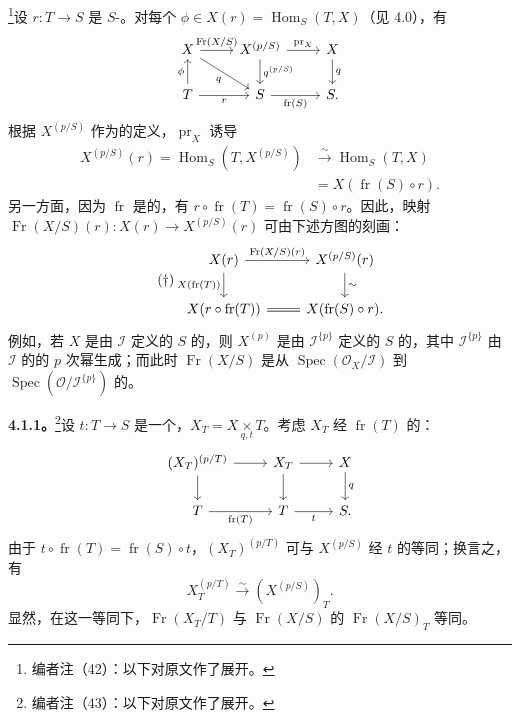 \footnote{编者注（42）：以下对原文作了展开。}设 $r:T\to S$ 是 $S$-。对每个 $\phi\in X(r)=\operatorname{Hom}_S(T,X)$（见 4.0），有
\[
\begin{tikzcd}
X\arrow[r,"\operatorname{Fr}(X/S)"]\arrow[dr,"q"']&X^{(p/S)}\arrow[r,"\operatorname{pr}_X"]\arrow[d,"q^{(p/S)}"]&X\arrow[d,"q"]\\
T\arrow[u,"\phi"]\arrow[r,"r"']&S\arrow[r,"\operatorname{fr}(S)"']&S.
\end{tikzcd}
\]
根据 $X^{(p/S)}$ 作为的定义，$\operatorname{pr}_X$ 诱导
\[
\begin{aligned}
X^{(p/S)}(r)=\operatorname{Hom}_S(T,X^{(p/S)})&\xrightarrow{\sim}\operatorname{Hom}_S(T,X)\\
&=X(\operatorname{fr}(S)\circ r).
\end{aligned}
\]
另一方面，因为 $\operatorname{fr}$ 是的，有 $r\circ\operatorname{fr}(T)=\operatorname{fr}(S)\circ r$。因此，映射 $\operatorname{Fr}(X/S)(r):X(r)\to X^{(p/S)}(r)$ 可由下述方图的刻画：
\[
\tag{$\dagger$}
\begin{tikzcd}
X(r)\arrow[r,"\operatorname{Fr}(X/S)(r)"]\arrow[d,"X(\operatorname{fr}(T))"']&X^{(p/S)}(r)\arrow[d,"\sim"]\\
X(r\circ\operatorname{fr}(T))\arrow[r,equal]&X(\operatorname{fr}(S)\circ r).
\end{tikzcd}
\]
例如，若 $X$ 是由 $\mathcal I$ 定义的 $S$ 的，则 $X^{(p)}$ 是由 $\mathcal I^{\{p\}}$ 定义的 $S$ 的，其中 $\mathcal I^{\{p\}}$ 由 $\mathcal I$ 的的 $p$ 次幂生成；而此时 $\operatorname{Fr}(X/S)$ 是从 $\operatorname{Spec}(\mathcal O_X/\mathcal I)$ 到 $\operatorname{Spec}(\mathcal O/\mathcal I^{\{p\}})$ 的。

\textbf{4.1.1。}\footnote{编者注（43）：以下对原文作了展开。}设 $t:T\to S$ 是一个，$X_T=X\mathbin{\mathop\times\limits_{q,t}}T$。考虑 $X_T$ 经 $\operatorname{fr}(T)$ 的：
\[
\begin{tikzcd}
(X_T)^{(p/T)}\arrow[r]\arrow[d]&X_T\arrow[r]\arrow[d]&X\arrow[d,"q"]\\
T\arrow[r,"\operatorname{fr}(T)"']&T\arrow[r,"t"']&S.
\end{tikzcd}
\]
由于 $t\circ\operatorname{fr}(T)=\operatorname{fr}(S)\circ t$，$(X_T)^{(p/T)}$ 可与 $X^{(p/S)}$ 经 $t$ 的等同；换言之，有
\[
X_T^{(p/T)}\xrightarrow{\sim}(X^{(p/S)})_T.
\]
显然，在这一等同下，$\operatorname{Fr}(X_T/T)$ 与 $\operatorname{Fr}(X/S)$ 的 $\operatorname{Fr}(X/S)_T$ 等同。

